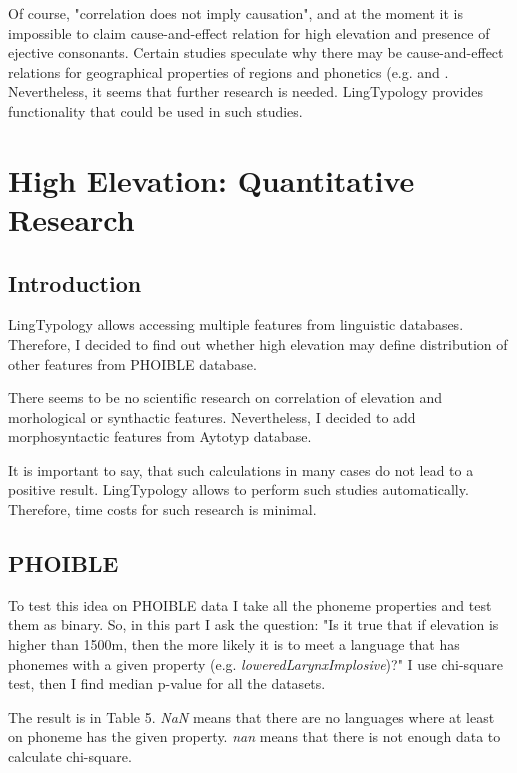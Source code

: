 \documentclass[a4paper,12pt]{article}
\begin{document}
Of course, "correlation does not imply causation", and at the moment it is impossible to claim cause-and-effect relation for high elevation and presence of ejective consonants. Certain studies speculate why there may be cause-and-effect relations for geographical properties of regions and phonetics (e.g. \parencite{ejectives} and \parencite{climatesSonorants}. Nevertheless, it seems that further research is needed. LingTypology provides functionality that could be used in such studies.

\newpage

\section{High Elevation: Quantitative Research}

\subsection{Introduction}
LingTypology allows accessing multiple features from linguistic databases. Therefore, I decided to find out whether high elevation may define distribution of other features from PHOIBLE database.

There seems to be no scientific research on correlation of elevation and morhological or synthactic features. Nevertheless, I decided to add morphosyntactic features from Aytotyp database.

It is important to say, that such calculations in many cases do not lead to a positive result. LingTypology allows to perform such studies automatically. Therefore, time costs for such research is minimal.

\subsection{PHOIBLE}

To test this idea on PHOIBLE data I take all the phoneme properties and test them as binary. So, in this part I ask the question: "Is it true that if elevation is higher than 1500m, then the more likely it is to meet a language that has phonemes with a given property (e.g. \textit{loweredLarynxImplosive})?" I use chi-square test, then I find median p-value for all the datasets.

The result is in Table 5. \textit{NaN} means that there are no languages where at least on phoneme has the given property. \textit{nan} means that there is not enough data to calculate chi-square.
\end{document}

